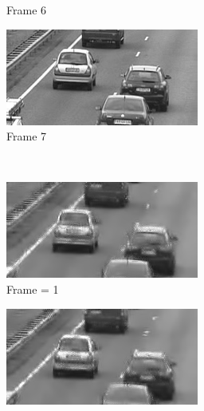 \documentclass[a4paper, landscape]{article}
\begin{document}
\begin{figure}[H]
\begin{subfigure}{0.13\linewidth}
		\caption{Frame 6}
	\end{subfigure}
	\begin{subfigure}{0.13\linewidth}
		\centering
		\includegraphics[width=\linewidth]{cars/frame = 7.png}
		\caption{Frame 7}
	\end{subfigure}\\
	\begin{subfigure}{0.13\linewidth}
		\centering
		\includegraphics[width=\linewidth]{cars/reconstructed, T = 3, frame = 1.png}
		\caption{Frame = 1}
	\end{subfigure}
	\begin{subfigure}{0.13\linewidth}
		\centering
		\includegraphics[width=\linewidth]{cars/reconstructed, T = 3, frame = 2.png}

\end{subfigure}
\end{figure}
\end{document}
